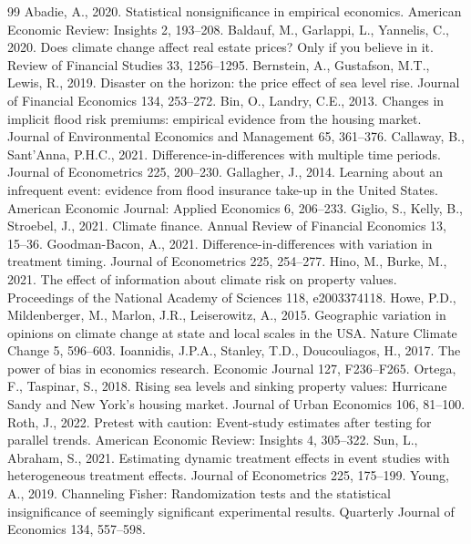 \documentclass[12pt]{article}
\begin{document}
\begin{thebibliography}{99}
 Abadie, A., 2020. Statistical nonsignificance in empirical
economics. American Economic Review: Insights 2, 193--208.
 Baldauf, M., Garlappi, L., Yannelis, C., 2020.
Does climate change affect real estate prices? Only if you believe in it. Review of Financial Studies 33, 1256--1295.
 Bernstein, A., Gustafson, M.T., Lewis, R., 2019.
Disaster on the horizon: the price effect of sea level rise. Journal of Financial Economics 134, 253--272.
 Bin, O., Landry, C.E., 2013.
Changes in implicit flood risk premiums: empirical evidence from the housing market. Journal of Environmental Economics and Management 65, 361--376.
 Callaway, B., Sant'Anna, P.H.C., 2021.
Difference-in-differences with multiple time periods. Journal of Econometrics 225, 200--230.
 Gallagher, J., 2014.
Learning about an infrequent event: evidence from flood insurance take-up in the United States. American Economic Journal: Applied Economics 6, 206--233.
 Giglio, S., Kelly, B., Stroebel, J., 2021.
Climate finance. Annual Review of Financial Economics 13, 15--36.
 Goodman-Bacon, A., 2021.
Difference-in-differences with variation in treatment timing. Journal of Econometrics 225, 254--277.
 Hino, M., Burke, M., 2021.
The effect of information about climate risk on property values. Proceedings of the National Academy of Sciences 118, e2003374118.
 Howe, P.D., Mildenberger, M., Marlon, J.R., Leiserowitz, A., 2015.
Geographic variation in opinions on climate change at state and local scales in the USA. Nature Climate Change 5, 596--603.
 Ioannidis, J.P.A., Stanley, T.D., Doucouliagos, H.,
2017. The power of bias in economics research. Economic Journal 127, F236--F265.
 Ortega, F., Taspinar, S., 2018.
Rising sea levels and sinking property values: Hurricane Sandy and New York's housing market. Journal of Urban Economics 106, 81--100.
 Roth, J., 2022. Pretest with caution: Event-study estimates after
testing for parallel trends. American Economic Review: Insights 4, 305--322.
 Sun, L., Abraham, S., 2021. Estimating dynamic
treatment effects in event studies with heterogeneous treatment effects. Journal of Econometrics 225, 175--199.
 Young, A., 2019. Channeling Fisher: Randomization tests and the
statistical insignificance of seemingly significant experimental results. Quarterly Journal of
Economics 134, 557--598.
\end{thebibliography}
\end{document}
